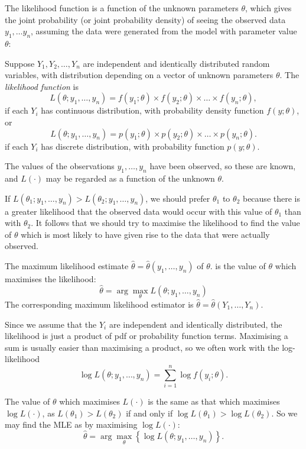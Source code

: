\documentclass[]{book}
\theoremstyle{definition}
\theoremstyle{definition}
\theoremstyle{definition}
\theoremstyle{remark}
\let\BeginKnitrBlock\begin \let\EndKnitrBlock\end
\begin{document}
The likelihood function is a function of the unknown parameters
\(\theta\), which gives the joint probability (or joint probability
density) of seeing the observed data \(y_1, \ldots y_n\), assuming the
data were generated from the model with parameter value \(\theta\):
\BeginKnitrBlock{definition}
\protect\hypertarget{def:unnamed-chunk-97}{}{\label{def:unnamed-chunk-97}
}Suppose \(Y_1, Y_2, \ldots, Y_n\) are independent and identically
distributed random variables, with distribution depending on a vector of
unknown parameters \(\theta\). The \emph{likelihood function} is
\[L(\theta; y_1, \ldots, y_n) = f(y_1 ; \theta) \times f(y_2 ; \theta) \times \ldots \times  f(y_n ; \theta),\]
if each \(Y_i\) has continuous distribution, with probability density
function \(f(y; \theta)\), or
\[L(\theta; y_1, \ldots, y_n) = p(y_1 ; \theta) \times p(y_2 ; \theta) \times \ldots \times p(y_n ; \theta).\]
if each \(Y_i\) has discrete distribution, with probability function
\(p(y; \theta)\).
\EndKnitrBlock{definition}

The values of the observations \(y_1, \ldots, y_n\) have been observed,
so these are known, and \(L(\cdot)\) may be regarded as a function of
the unknown \(\theta\).

If
\(L(\theta_1 ; y_1 , \ldots, y_n) > L(\theta_2 ; y_1 , \ldots, y_n )\),
we should prefer \(\theta_1\) to \(\theta_2\) because there is a greater
likelihood that the observed data would occur with this value of
\(\theta_1\) than with \(\theta_2\). It follows that we should try to
maximise the likelihood to find the value of \(\theta\) which is most
likely to have given rise to the data that were actually observed.

The maximum likelihood estimate
\(\hat \theta = \hat \theta(y_1, \ldots, y_n)\) of \(\theta\). is the
value of \(\theta\) which maximises the likelihood:
\[\hat \theta = \arg \max_{\theta}L(\theta; y_1, \ldots, y_n)\] The
corresponding maximum likelihood estimator is
\(\hat \theta = \hat \theta(Y_1, \ldots, Y_n)\).

Since we assume that the \(Y_i\) are independent and identically
distributed, the likelihood is just a product of pdf or probability
function terms. Maximising a sum is usually easier than maximising a
product, so we often work with the log-likelihood
\[\log L(\theta; y_1, \ldots, y_n) = 
  \sum_{i=1}^n \log f(y_i; \theta).\]

The value of \(\theta\) which maximises \(L(\cdot)\) is the same as that
which maximises \(\log L(\cdot)\), as \(L(\theta_1 ) > L(\theta_2)\) if
and only if \(\log L(\theta_1) > \log L(\theta_2)\). So we may find the
MLE as by maximising \(\log L(\cdot)\):
\[\hat \theta = \arg \max_{\theta}\left\{\log L(\theta; y_1, \ldots, y_n)\right\}.\]
\end{document}
